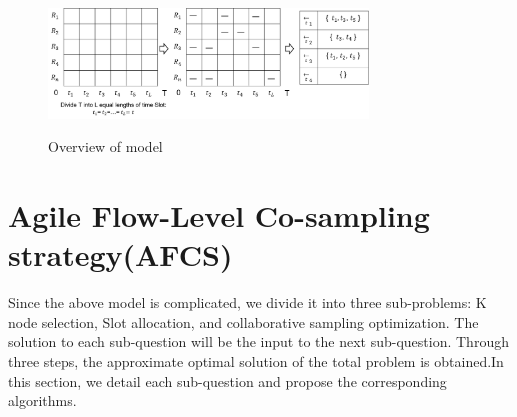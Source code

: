 \documentclass[conference]{IEEEtran}
\begin{document}
 

\begin{figure}[!!!!!!!!!!!!!!hhhhhhhhhht]
\centering

\includegraphics[width=8.5cm]{images/slot_num_order.png}
\label{fig_1_slot}

\caption{Overview of model}
\label{fig_1_model}
\end{figure}



\section{Agile Flow-Level Co-sampling strategy(AFCS)}
Since the above model is complicated, we divide it into three sub-problems: K node selection, Slot allocation, and collaborative sampling optimization. The solution to each sub-question will be the input to the next sub-question. Through three steps, the approximate optimal solution of the total problem is obtained.In this section, we detail each sub-question and propose the corresponding algorithms.
\end{document}
